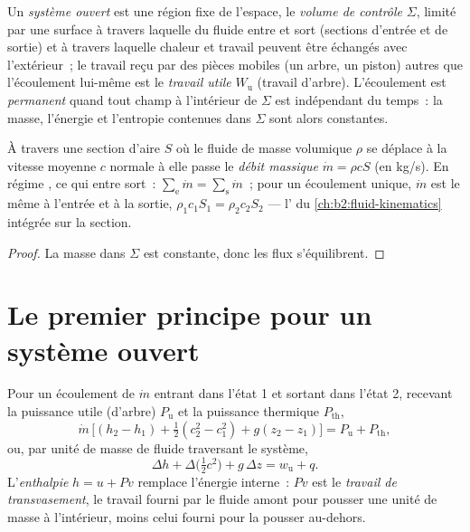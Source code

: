 \begin{definition}\label{def:b2:open-systems:cv}
Un \emph{système ouvert} est une région fixe de l'espace,
le \emph{volume de contrôle} $\Sigma$, limité par une
surface à travers laquelle du fluide entre et sort (sections d'entrée et de
sortie) et à travers laquelle chaleur et travail peuvent être échangés avec
l'extérieur~; le travail reçu par des pièces mobiles (un arbre, un piston)
autres que l'écoulement lui-même est le \emph{travail utile}
$W_{\text{u}}$ (travail d'arbre). L'écoulement est \emph{permanent} quand tout champ à l'intérieur de $\Sigma$ est indépendant du temps~: la masse,
l'énergie et l'entropie contenues dans $\Sigma$ sont alors constantes.
\end{definition}

\begin{proposition}\label{prop:b2:open-systems:mass}
À travers une section d'aire $S$ où le fluide de masse volumique $\rho$ se déplace
à la vitesse moyenne $c$ normale à elle passe le \emph{débit
massique} $\dot m = \rho c S$ (en \unit{kg/s}). En
régime , ce qui entre sort~: $\sum_{\text{e}}\dot m = \sum_{\text{s}}
\dot m$~; pour un écoulement unique, $\dot m$ est le même à l'entrée et à la sortie,
$\rho_1c_1S_1 = \rho_2c_2S_2$ --- l' du
\cref{ch:b2:fluid-kinematics} intégrée sur la section.
\end{proposition}

\begin{proof}
La masse dans $\Sigma$ est constante, donc les flux s'équilibrent.
\end{proof}

\section{Le premier principe pour un système ouvert}

\begin{theorem}\label{thm:b2:open-systems:firstlaw}
Pour un écoulement  de  $\dot m$ entrant dans l'état 1
et sortant dans l'état 2, recevant la puissance utile (d'arbre)
$P_{\text{u}}$ et la puissance thermique $P_{\text{th}}$,
\[
\dot m\,\Big[(h_2 - h_1) + \tfrac12(c_2^2 - c_1^2) + g(z_2 - z_1)\Big]
= P_{\text{u}} + P_{\text{th}} ,
\]
ou, par unité de masse de fluide traversant le système,
\[
\Delta h + \Delta\big(\tfrac12c^2\big) + g\,\Delta z = w_{\text{u}} + q .
\]
L'\emph{enthalpie} $h = u + Pv$ remplace
l'énergie interne~: $Pv$ est le \emph{travail de transvasement}, le travail fourni par
le fluide amont pour pousser une unité de masse à l'intérieur, moins celui fourni pour la pousser
au-dehors.
\end{theorem}

